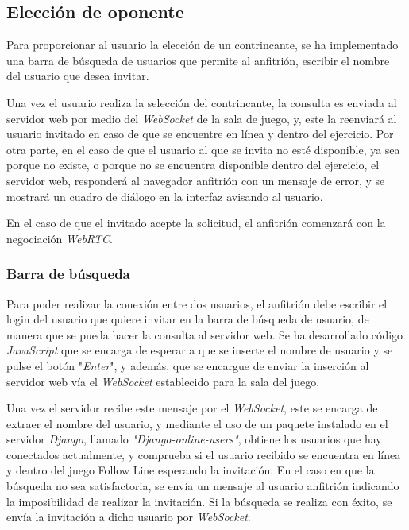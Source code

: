\documentclass[a4paper, 12pt]{book}
\begin{document}
\subsection{Elección de oponente}
\label{sec:follow_line_game_sync_oponente_chat}

Para proporcionar al usuario la elección de un contrincante, se ha implementado una barra de búsqueda de usuarios que permite al anfitrión, escribir el nombre del usuario que desea invitar.

Una vez el usuario realiza la selección del contrincante, la consulta es enviada al servidor web por medio del \emph{WebSocket} de la sala de juego, y, este la reenviará al usuario invitado en caso de que se encuentre en línea y dentro del ejercicio. Por otra parte, en el caso de que el usuario al que se invita no esté disponible, ya sea porque no existe, o porque no se encuentra disponible dentro del ejercicio, el servidor web, responderá al navegador anfitrión con un mensaje de error, y se mostrará un cuadro de diálogo en la interfaz avisando al usuario.

En el caso de que el invitado acepte la solicitud, el anfitrión comenzará con la negociación \emph{WebRTC}. 

\subsubsection{Barra de búsqueda}

Para poder realizar la conexión entre dos usuarios, el anfitrión debe escribir el login del usuario que quiere invitar en la barra de búsqueda de usuario, de manera que se pueda hacer la consulta al servidor web. Se ha desarrollado código \emph{JavaScript} que se encarga de esperar a que se inserte el nombre de usuario y se pulse el botón "\emph{Enter}", y además, que se encargue de enviar la inserción al servidor web vía el \emph{WebSocket} establecido para la sala del juego.

Una vez el servidor recibe este mensaje por el \emph{WebSocket}, este se encarga de extraer el nombre del usuario, y mediante el uso de un paquete instalado en el servidor \emph{Django}, llamado \emph{"Django-online-users"}, obtiene los usuarios que hay conectados actualmente, y comprueba si el usuario recibido se encuentra en línea y dentro del juego Follow Line esperando la invitación. En el caso en que la búsqueda no sea satisfactoria, se envía un mensaje al usuario anfitrión indicando la imposibilidad de realizar la invitación. Si la búsqueda se realiza con éxito, se envía la invitación a dicho usuario por \emph{WebSocket}.
\end{document}
